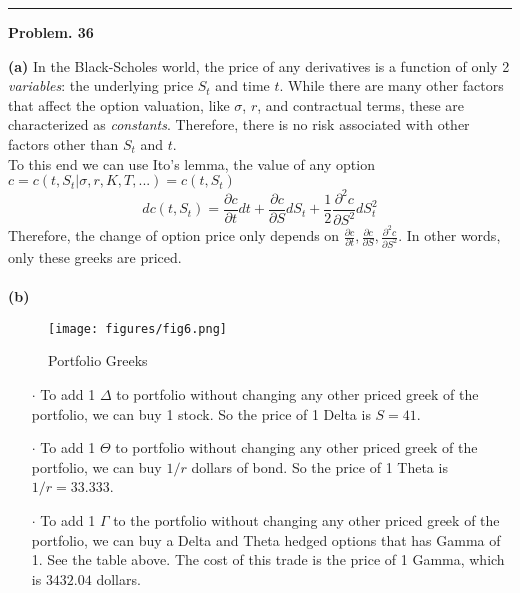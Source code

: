\documentclass[10 pt]{hwtemplate} %
\begin{document}
\noindent\rule{16cm}{0.4pt}
\textbf{Problem. 36} 
\begin{solution} \textbf{(a)} In the Black-Scholes world, the price of any derivatives is a function of only 2 \textit{variables}: the underlying price $S_t$ and time $t$. While there are many other factors that affect the option valuation, like $\sigma$, $r$, and contractual terms, these are characterized as \textit{constants}. Therefore, there is no risk associated with other factors other than $S_t$ and $t$. \\
To this end we can use Ito's lemma, the value of any option $c = c(t,S_t| \sigma, r, K ,T,...) = c(t,S_t)$
$$
dc(t,S_t) = \frac{\partial c}{\partial t} dt + \frac{\partial c}{\partial S} dS_t + \frac{1}{2} \frac{\partial^2 c}{\partial S^2} dS_t^2
$$
Therefore, the change of option price only depends on $\frac{\partial c}{\partial t}, \frac{\partial c}{\partial S}, \frac{\partial^2 c}{\partial S^2}$. In other words, only these greeks are priced.\\
~\\
\textbf{(b)}
\begin{figure}[H]
  \centering
  \captionsetup{justification=centering}
  \caption{Portfolio Greeks}
  \texttt{[image: figures/fig6.png]}
\end{figure}
\begin{itemize}
	\item[$\cdot$] To add 1 $\Delta$ to portfolio without changing any other priced greek of the portfolio, we can buy 1 stock. So the price of 1 Delta is $S= 41$.
	\item[$\cdot$] To add 1 $\Theta$ to portfolio without changing any other priced greek of the portfolio, we can buy $1/r$ dollars of bond.  So the price of 1 Theta is $1/r = 33.333$.
	\item[$\cdot$] To add 1 $\Gamma$ to the portfolio without changing any other priced greek of the portfolio, we can buy a Delta and Theta hedged options that has Gamma of 1. See the table above. The cost of this trade is the price of 1 Gamma, which is $3432.04$ dollars. 
\end{itemize}
\end{solution}
\end{document}

